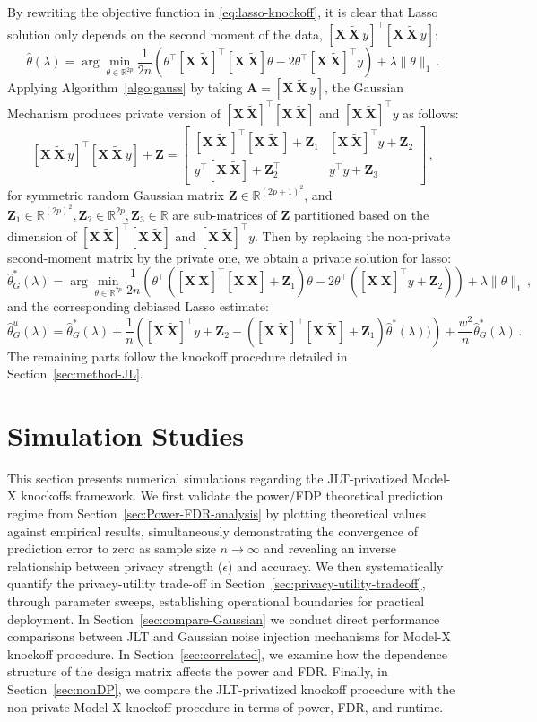 \documentclass[11pt]{article}
\newcommand{\bX}{\boldsymbol{X}}
\newcommand{\bXT}{\widetilde{\bX} }
\newcommand{\bA}{\boldsymbol{A}}
\newcommand{\bZ}{\boldsymbol{Z}}
\newcommand{\mbR}{\mathbb{R}}
\newcommand{\hth}{\widehat{\theta}}
\begin{document}
By rewriting the objective function in \eqref{eq:lasso-knockoff}, it is clear that Lasso solution only depends on the second moment of the data, $[\bX\ \bXT\ y]^\top[\bX\ \bXT \ y]$:
\[
\hth(\lambda) = \arg\min_{\theta\in\mbR^{2p}}\frac{1}{2n}\left(\theta^\top[\bX\ \bXT]^\top [\bX\ \bXT]\theta-2\theta^\top[\bX\ \bXT]^\top y\right)+\lambda\|\theta\|_1\,.
\]
Applying Algorithm~\ref{algo:gauss} by taking $\bA = [\bX\ \bXT\ y]$, the Gaussian Mechanism produces private version of $[\bX\ \bXT]^\top [\bX\ \bXT]$ and $[\bX\ \bXT]^\top y$ as follows:
\[
[\bX\ \bXT\ y]^\top[\bX\ \bXT \ y]+\bZ=
\begin{bmatrix}
    [\bX\ \bXT\ ]^\top[\bX\ \bXT \ ]+\bZ_1 & [\bX\ \bXT]^\top y+\bZ_2\\
    y^\top [\bX\ \bXT]+\bZ_2^\top & y^\top y+\bZ_3
\end{bmatrix}\,,
\]
for symmetric random Gaussian matrix $\bZ\in\mbR^{(2p+1)^2}$, and $\bZ_1\in\mbR^{(2p)^2},\bZ_2\in\mbR^{2p},\bZ_3\in\mbR$ are sub-matrices of $\bZ$ partitioned  based on the dimension of $[\bX\ \bXT]^\top [\bX\ \bXT]$ and $[\bX\ \bXT]^\top y$. Then by replacing the non-private second-moment matrix by the private one, we obtain a private solution for lasso:
\[
\hth^*_G(\lambda) = \arg\min_{\theta\in\mbR^{2p}}\frac{1}{2n}\left(\theta^\top([\bX\ \bXT]^\top [\bX\ \bXT]+\bZ_1)\theta-2\theta^\top([\bX\ \bXT]^\top y+\bZ_2)\right)+\lambda\|\theta\|_1\,,
\]
and the corresponding debiased Lasso estimate:
\[
\hth^u_G(\lambda) = \hth_G^*(\lambda) +\frac{1}{n}\left([\bX\ \bXT]^\top y+\bZ_2-([\bX\ \bXT]^\top[\bX\ \bXT]+\bZ_1)\hth^*(\lambda))\right)+\frac{w^2}{n }\hth_G^*(\lambda) \,.
\]
The remaining parts follow the knockoff procedure detailed in Section~\ref{sec:method-JL}.

\section{Simulation Studies}\label{sec:simulation}

This section presents numerical simulations regarding the JLT-privatized Model-X knockoffs framework. We first validate the power/FDP theoretical prediction regime from Section~\ref{sec:Power-FDR-analysis} by plotting theoretical values against empirical results, simultaneously demonstrating the convergence of prediction error to zero as sample size $n\to \infty$ and revealing an inverse relationship between privacy strength ($\epsilon$) and accuracy. We then systematically quantify the privacy-utility trade-off in Section~\ref{sec:privacy-utility-tradeoff}, through parameter sweeps, establishing operational boundaries for practical deployment. In Section~\ref{sec:compare-Gaussian} we conduct direct performance comparisons between JLT and Gaussian noise injection mechanisms for Model-X knockoff procedure. In Section~\ref{sec:correlated}, we examine how the dependence structure of the design matrix affects the power and FDR. Finally, in Section~\ref{sec:nonDP}, we compare the JLT-privatized knockoff procedure with the non-private Model-X knockoff procedure in terms of power, FDR, and runtime.
\end{document}
